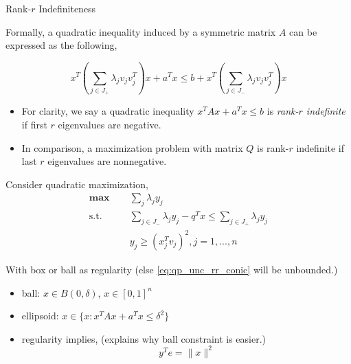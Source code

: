 \documentclass[aspectratio=1610, 10pt]{beamer}
\newcommand{\mx}{\mathbf{\max}\;}
\newcommand{\st}{\mathrm{s.t.\;}}
\begin{document}
\begin{frame}[allowframebreaks]{Rank-\(r\) Indefiniteness}

  Formally, a quadratic inequality induced by a symmetric matrix \(A\) can be expressed as the following,

  \begin{equation}
    x^T \left(\sum_{j\in J_+} \lambda_j v_jv_j^T\right)x +a^Tx \le b + x^T\left(\sum_{j\in J_-} \lambda_j v_jv_j^T\right)x
  \end{equation}

  \begin{itemize}
    \item For clarity, we say a quadratic inequality \(x^TAx + a^Tx \le b\) is \emph{rank-\(r\) indefinite} if first \(r\) eigenvalues are negative.
    \item In comparison, a maximization problem with matrix \(Q\) is rank-\(r\) indefinite if last \(r\) eigenvalues are nonnegative.
  \end{itemize}

  \framebreak

  Consider quadratic maximization,
  \begin{equation}\label{eq:qp_unc_rr_conic}
    \begin{aligned}
      \mx \quad & \sum_j \lambda_j y_j                                                             \\
      \st \quad & \sum_{j \in J_{-}} \lambda_{j} y_j - q^T x \le  \sum_{j \in J_{+}} \lambda_j y_j \\
                & y_j \ge (x_j^T v_j)^2, j= 1, ..., n
    \end{aligned}
  \end{equation}

  With box or ball as regularity (else \eqref{eq:qp_unc_rr_conic} will be unbounded.)
  \begin{itemize}
    \item ball: \(x\in B(0, \delta)\), \(x\in [0, 1]^n\)
    \item ellipsoid: \(x \in \{x: x^TAx + a^Tx \le \delta^2\}\)
    \item regularity implies, (explains why ball constraint is easier.)
          \begin{equation}
            y^Te = \|x\|^2
          \end{equation}
  \end{itemize}
\end{frame}
\end{document}
